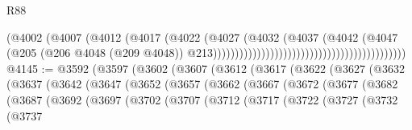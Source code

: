 \begin{lexlean}{R88}
\begin{coremodule}
                                                                      (@4002
                                                                        (@4007
                                                                          (@4012
                                                                            (@4017
                                                                              (@4022
                                                                                (@4027
                                                                                  (@4032
                                                                                    (@4037
                                                                                      (@4042
                                                                                        (@4047
                                                                                          (@205
                                                                                            (@206
                                                                                              @4048
                                                                                              (@209
                                                                                                @4048))
                                                                                            @213))))))))))))))))))))))))))))))))))))))))))))
@4145 := @3592
    (@3597
      (@3602
        (@3607
          (@3612
            (@3617
              (@3622
                (@3627
                  (@3632
                    (@3637
                      (@3642
                        (@3647
                          (@3652
                            (@3657
                              (@3662
                                (@3667
                                  (@3672
                                    (@3677
                                      (@3682
                                        (@3687
                                          (@3692
                                            (@3697
                                              (@3702
                                                (@3707
                                                  (@3712
                                                    (@3717
                                                      (@3722
                                                        (@3727
                                                          (@3732
                                                            (@3737

\end{coremodule}
\end{lexlean}
